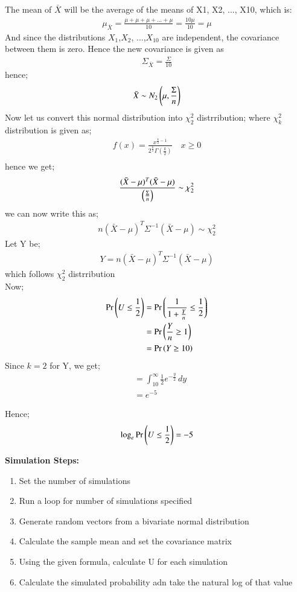 \documentclass[journal,12pt,onecolumn]{IEEEtran}
\theoremstyle{remark}
\begin{document}
The mean of $\bar{X}$ will be the average of the means of X1, X2, ..., X10, which is:
\begin{align}
    \mu_{\bar{X}} =\frac{\mu + \mu + \mu + ... + \mu}{10} = \frac{10\mu}{10} = \mu   
\end{align}
And since the distributions $X_1$,$X_2$, ...,$X_{10}$ are independent, the covariance between them is zero. Hence the 
new covariance is given as
\begin{align}
    \Sigma_{\bar{X}} = \frac{\Sigma}{10}
\end{align}
hence;
\begin{align}
    \bar{X} \sim N_2\left(\mu,\frac{\Sigma}{n}\right)
\end{align}
Now let us convert this normal distribution into $\chi^{2}_{2}$ distrribution; where $\chi^{2}_{k}$ distribution is given as;
\begin{align}
    f(x) = \frac{x^{\frac{k}{2}-1}}{2^{\frac{k}{2}}\Gamma(\frac{k}{2})} \quad  x \ge 0\\
\end{align}
hence we get;
\begin{align}
    \frac{(\bar{X}-\mu)^T(\bar{X}-\mu)}{\left(\frac{\Sigma}{n}\right)} \sim \chi^{2}_{2}
\end{align}
we can now write this as;
\begin{align}
    n(\bar{X} - \mu)^T\Sigma^{-1}(\bar{X} - \mu) \sim \chi^{2}_{2}
\end{align}
Let Y be;
\begin{align}
    Y = n(\bar{X} - \mu)^T\Sigma^{-1}(\bar{X} - \mu)
\end{align}
which follows $\chi^{2}_{2}$ distrribution\\
Now;
\begin{align}
    \Pr\left(U \le \frac{1}{2}\right)
    &= \Pr\left(\frac{1}{1+\frac{Y}{n}} \le \frac{1}{2}\right)\\
    &= \Pr\left(\frac{Y}{n} \ge 1\right)\\
    &= \Pr\left(Y \ge 10\right)
\end{align}
Since $k=2$ for Y, we get;
\begin{align}
    &= \int_{10}^{\infty} \frac{1}{2}e^{-\frac{y}{2}} \,dy\\
    &= e^{-5}   
\end{align}

Hence;
\begin{align}
    \log_e \Pr\left(U \le \frac{1}{2}\right) = -5
\end{align}

\textbf{Simulation Steps:}
\begin{enumerate}
    \item Set the number of simulations
    \item Run a loop for number of simulations specified
    \item Generate random vectors from a bivariate normal distribution
    \item Calculate the sample mean and set the covariance matrix
    \item Using the given formula, calculate U for each simulation
    \item Calculate the simulated probability adn take the natural log of that value
\end{enumerate}
\end{document}
